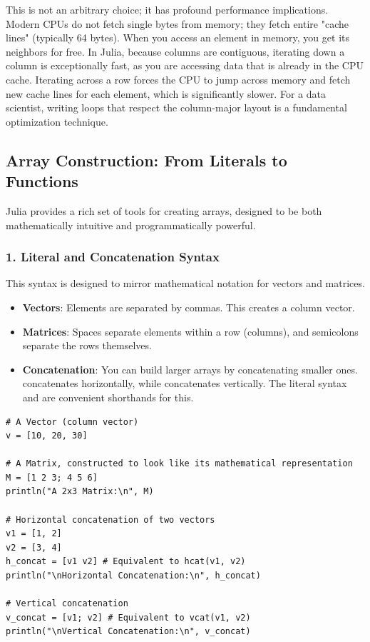 \begin{remark}
This is not an arbitrary choice; it has profound performance implications. Modern CPUs do not fetch single bytes from memory; they fetch entire "cache lines" (typically 64 bytes). When you access an element in memory, you get its neighbors for free. In Julia, because columns are contiguous, iterating down a column is exceptionally fast, as you are accessing data that is already in the CPU cache. Iterating across a row forces the CPU to jump across memory and fetch new cache lines for each element, which is significantly slower. For a data scientist, writing loops that respect the column-major layout is a fundamental optimization technique.
\end{remark}

\subsection*{Array Construction: From Literals to Functions}
Julia provides a rich set of tools for creating arrays, designed to be both mathematically intuitive and programmatically powerful.

\subsubsection*{1. Literal and Concatenation Syntax}
This syntax is designed to mirror mathematical notation for vectors and matrices.
\begin{itemize}
    \item \textbf{Vectors}: Elements are separated by commas. This creates a column vector.
    \item \textbf{Matrices}: Spaces separate elements within a row (columns), and semicolons separate the rows themselves.
    \item \textbf{Concatenation}: You can build larger arrays by concatenating smaller ones.  concatenates horizontally, while  concatenates vertically. The literal syntax \jcode{[A B]} and \jcode{[A; B]} are convenient shorthands for this.
\end{itemize}

\begin{example}
\text{ }\begin{verbatim}
# A Vector (column vector)
v = [10, 20, 30]

# A Matrix, constructed to look like its mathematical representation
M = [1 2 3; 4 5 6]
println("A 2x3 Matrix:\n", M)

# Horizontal concatenation of two vectors
v1 = [1, 2]
v2 = [3, 4]
h_concat = [v1 v2] # Equivalent to hcat(v1, v2)
println("\nHorizontal Concatenation:\n", h_concat)

# Vertical concatenation
v_concat = [v1; v2] # Equivalent to vcat(v1, v2)
println("\nVertical Concatenation:\n", v_concat)
\end{verbatim}
\end{example}

